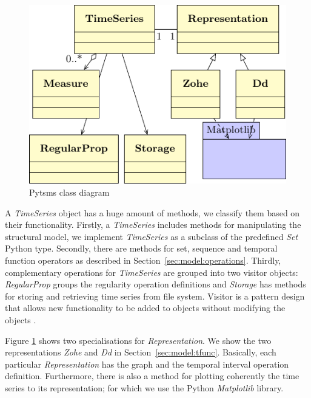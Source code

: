 \begin{figure}[tp]
  \centering
  \includegraphics{fig_pytsms_uml.pdf}
  \caption{Pytsms  class diagram}
  \label{fig:implementacio:pytsms-uml}
\end{figure}




A \emph{TimeSeries} object has a huge amount of methods, we classify
them based on their functionality. Firstly, a \emph{TimeSeries}
includes methods for manipulating the structural model, we implement
\emph{TimeSeries} as a subclass of the predefined \emph{Set} Python
type. Secondly, there are methods for set, sequence and temporal
function operators as described in Section~\ref{sec:model:operations}.
Thirdly, complementary operations for \emph{TimeSeries} are grouped
into two visitor objects: \emph{RegularProp} groups the regularity
operation definitions and \emph{Storage} has methods for storing and
retrieving time series from file system. Visitor is a pattern design
that allows new functionality to be added to objects without modifying
the objects
\cite{ziade08:expert_python_programming:visitor,martin02:visitor}.


Figure \ref{fig:implementacio:pytsms-uml} shows two specialisations
for \emph{Representation}. We show the two representations \emph{Zohe}
and \emph{Dd} in Section~\ref{sec:model:tfunc}. Basically, each
particular \emph{Representation} has the graph and the temporal
interval operation definition. Furthermore, there is also a method for
plotting coherently the time series to its representation; for which
we use the Python \emph{Matplotlib} library.



